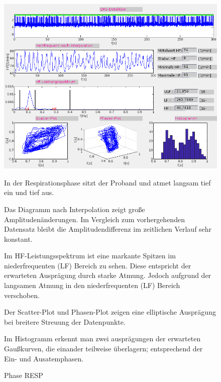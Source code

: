 \documentclass[a4paper,12pt,titlepage]{scrartcl}
\begin{document}
\begin{figure}[ht]
    \begin{minipage}[t]{0.5\linewidth}
        \centering
        \includegraphics[width=0.9\linewidth, valign=t]{Assets/LaborBMT-17-00-21.png}
        \caption{Phase RESP}
        \label{phaseresp}
    \end{minipage}%
    \begin{minipage}[t]{0.5\linewidth}
        In der Respirationsphase sitzt der Proband und atmet langsam tief ein und tief aus.

        Das Diagramm nach Interpolation zeigt große Amplitudenänderungen. Im Vergleich zum vorhergehenden Datensatz bleibt die Amplitudendifferenz im zeitlichen Verlauf sehr konstant.

        Im HF-Leistungsspektrum ist eine markante Spitzen im niederfrequenten (LF) Bereich zu sehen. Diese entspricht der erwarteten Ausprägung durch starke Atmung. Jedoch aufgrund der langsamen Atmung in den niederfrequenten (LF) Bereich verschoben.

        Der Scatter-Plot und Phasen-Plot zeigen eine elliptische Ausprägung bei breitere Streuung der Datenpunkte.

        Im Histogramm erkennt man zwei ausprägungen der erwarteten Gaußkurven, die einander teilweise überlagern; entsprechend der Ein- und Ausatemphasen.

    \end{minipage}
\end{figure}
\end{document}
